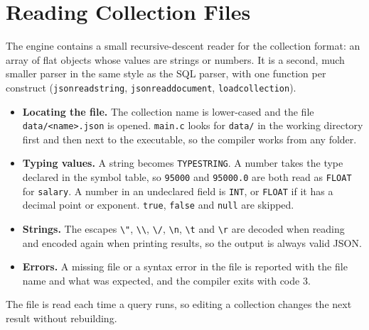 \documentclass[12pt,a4paper]{report}
\newcommand{\codeus}{\textunderscore\allowbreak}
\DeclareRobustCommand{\code}[1]{\texttt{\let\_\codeus #1}}
\begin{document}
\section{Reading Collection Files}\label{sec:jsonreader}
The engine contains a small recursive-descent reader for the collection format: an array of flat objects whose values are strings or numbers. It is a second, much smaller parser in the same style as the SQL parser, with one function per construct (\code{json\_read\_string}, \code{json\_read\_document}, \code{load\_collection}).
\begin{itemize}
  \item \textbf{Locating the file.} The collection name is lower-cased and the file \code{data/<name>.json} is opened. \code{main.c} looks for \code{data/} in the working directory first and then next to the executable, so the compiler works from any folder.
  \item \textbf{Typing values.} A string becomes \code{TYPE\_STRING}. A number takes the type declared in the symbol table, so \code{95000} and \code{95000.0} are both read as \code{FLOAT} for \code{salary}. A number in an undeclared field is \code{INT}, or \code{FLOAT} if it has a decimal point or exponent. \code{true}, \code{false} and \code{null} are skipped.
  \item \textbf{Strings.} The escapes \code{\textbackslash"}, \code{\textbackslash\textbackslash}, \code{\textbackslash/}, \code{\textbackslash n}, \code{\textbackslash t} and \code{\textbackslash r} are decoded when reading and encoded again when printing results, so the output is always valid JSON.
  \item \textbf{Errors.} A missing file or a syntax error in the file is reported with the file name and what was expected, and the compiler exits with code 3.
\end{itemize}
The file is read each time a query runs, so editing a collection changes the next result without rebuilding.
\end{document}
